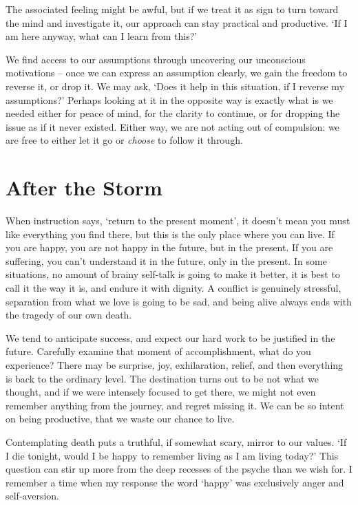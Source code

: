 
The associated feeling might be awful, but if we treat it as sign to
turn toward the mind and investigate it, our approach can stay practical
and productive. `If I am here anyway, what can I learn from this?'

We find access to our assumptions through uncovering our unconscious
motivations -- once we can express an assumption clearly, we gain the
freedom to reverse it, or drop it. We may ask, `Does it help in this
situation, if I reverse my assumptions?' Perhaps looking at it in the
opposite way is exactly what is we needed either for peace of mind, for
the clarity to continue, or for dropping the issue as if it never
existed. Either way, we are not acting out of compulsion: we are free to
either let it go or \emph{choose} to follow it through.

\clearpage

\section{After the Storm}


When instruction says, `return to the present moment', it doesn't mean
you must like everything you find there, but this is the only place
where you can live. If you are happy, you are not happy in the future,
but in the present. If you are suffering, you can't understand it in the
future, only in the present. In some situations, no amount of brainy
self-talk is going to make it better, it is best to call it the way it
is, and endure it with dignity. A conflict is genuinely stressful,
separation from what we love is going to be sad, and being alive always
ends with the tragedy of our own death.

We tend to anticipate success, and expect our hard work to be justified
in the future. Carefully examine that moment of accomplishment, what do
you experience? There may be surprise, joy, exhilaration, relief, and
then everything is back to the ordinary level. The destination turns out
to be not what we thought, and if we were intensely focused to get
there, we might not even remember anything from the journey, and regret
missing it. We can be so intent on being productive, that we waste our
chance to live.


Contemplating death puts a truthful, if somewhat scary, mirror to our
values. `If I die tonight, would I be happy to remember living as I am
living today?' This question can stir up more from the deep recesses of
the psyche than we wish for. I remember a time when my response the word
`happy' was exclusively anger and self-aversion.

